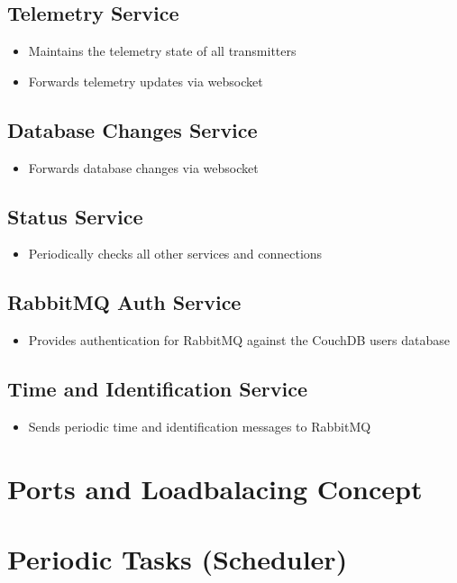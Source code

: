 \subsection{Telemetry Service}
\begin{itemize}
\item Maintains the telemetry state of all transmitters
\item Forwards telemetry updates via websocket
\end{itemize}

\subsection{Database Changes Service}
\begin{itemize}
\item Forwards database changes via websocket
\end{itemize}

\subsection{Status Service}
\begin{itemize}
\item Periodically checks all other services and connections
\end{itemize}

\subsection{RabbitMQ Auth Service}
\begin{itemize}
\item Provides authentication for RabbitMQ against the CouchDB users database
\end{itemize}

\subsection{Time and Identification Service}
\begin{itemize}
\item Sends periodic time and identification messages to RabbitMQ
\end{itemize}

\section{Ports and Loadbalacing Concept}

\section{Periodic Tasks (Scheduler)}

